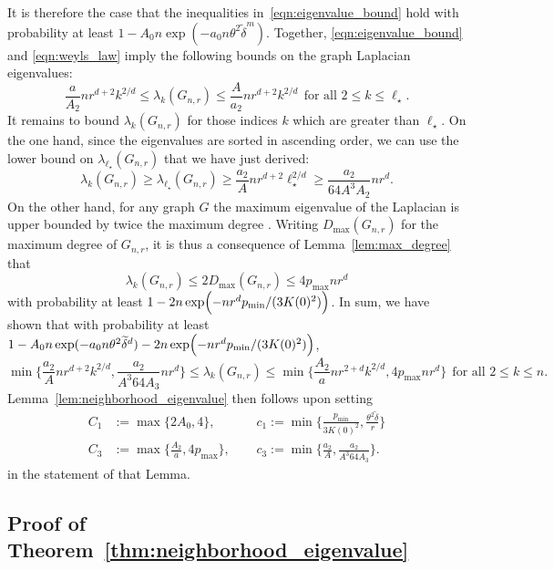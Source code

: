 \documentclass[twoside]{article}
\newcommand{\1}{\mathbf{1}}
\newcommand{\wt}[1]{\widetilde{#1}}
\theoremstyle{definition}
\theoremstyle{remark}
\begin{document}
It is therefore the case that the inequalities in~\eqref{eqn:eigenvalue_bound} hold with probability at least $1 - A_0n\exp(-a_0n\theta^2\wt{\delta}^{m})$. Together, \eqref{eqn:eigenvalue_bound} and \eqref{eqn:weyls_law} imply the following bounds on the graph Laplacian eigenvalues:
\begin{equation*}
\frac{a}{A_2} nr^{d + 2} k^{2/d} \leq \lambda_k(G_{n,r}) \leq \frac{A}{a_2} nr^{d + 2} k^{2/d}~~\textrm{for all $2 \leq k \leq \ell_{\star}$}.
\end{equation*}
It remains to bound $\lambda_k(G_{n,r})$ for those indices $k$ which are greater than $\ell_{\star}$. On the one hand, since the eigenvalues are sorted in ascending order, we can use the lower bound on $\lambda_{\ell_{\star}}(G_{n,r})$ that we have just derived:
\begin{equation*}
\lambda_k(G_{n,r}) \geq \lambda_{\ell_{\star}}(G_{n,r}) \geq \frac{a_2}{A}nr^{d + 2}\ell_{\star}^{2/d} \geq \frac{a_2}{64A^3 A_2} nr^{d}.
\end{equation*}
On the other hand, for any graph $G$ the maximum eigenvalue of the Laplacian is upper bounded by twice the maximum degree \citep{chung97}. Writing $D_{\max}(G_{n,r})$ for the maximum degree of $G_{n,r}$, it is thus a consequence of Lemma~\ref{lem:max_degree} that
\begin{equation*}
\lambda_k(G_{n,r}) \leq 2D_{\max}(G_{n,r}) \leq 4p_{\max}nr^d 
\end{equation*}
with probability at least $1 - 2n\exp\Bigl(-nr^dp_{\min}/(3K(0)^2)\Bigr)$. In sum, we have shown that with probability at least $1 - A_0n\exp(-a_0n\theta^2\wt{\delta}^{d}) - 2n\exp\Bigl(-nr^dp_{\min}/(3K(0)^2)\Bigr)$,
\begin{equation*}
\min\biggl\{\frac{a_2}{A}nr^{d + 2}k^{2/d}, \frac{a_2}{A^3 64 A_3} nr^d\biggr\} \leq \lambda_k(G_{n,r}) \leq \min\biggl\{\frac{A_2}{a}nr^{2 + d}k^{2/d}, 4p_{\max}nr^d\biggr\}~~\textrm{for all $2 \leq k \leq n$.}
\end{equation*}
Lemma~\ref{lem:neighborhood_eigenvalue} then follows upon setting
\begin{align*}
C_1 & := \max\{2A_0,4\},~~ && c_1 := \min\Biggl\{\frac{p_{\min}}{3K(0)^2}, \frac{\theta^2\wt{\delta}}{r}\Biggr\} \\
C_3 & := \max\biggl\{\frac{A_2}{a}, 4p_{\max}\biggr\},~~ && c_3 := \min\biggl\{\frac{a_2}{A}, \frac{a_2}{A^3 64 A_3} \biggr\}.
\end{align*}
in the statement of that Lemma.

\subsection{Proof of Theorem~\ref{thm:neighborhood_eigenvalue}}
\end{document}
